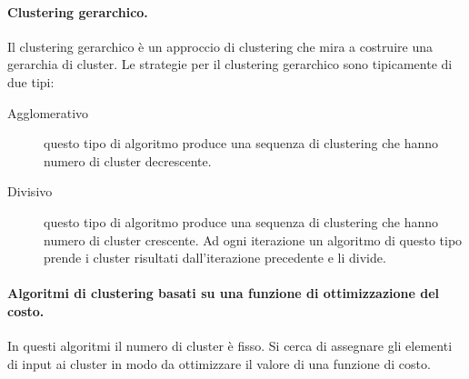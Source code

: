 \paragraph{Clustering gerarchico.}
Il clustering gerarchico \`e un approccio di clustering che mira a costruire una gerarchia di cluster. 
Le strategie per il clustering gerarchico sono tipicamente di due tipi:
\begin{description}
  \item[Agglomerativo] 
    questo tipo di algoritmo produce una sequenza di clustering che hanno numero di cluster decrescente. 
  \item[Divisivo]
    questo tipo di algoritmo produce una sequenza di clustering che hanno numero di cluster crescente. 
    Ad ogni iterazione un algoritmo di questo tipo prende i cluster risultati dall'iterazione precedente e li divide.
\end{description}


\paragraph{Algoritmi di clustering basati su una funzione di ottimizzazione del costo.}
In questi algoritmi il numero di cluster \`e fisso. 
Si cerca di assegnare gli elementi di input ai cluster in modo da ottimizzare il valore di una funzione di costo. 






